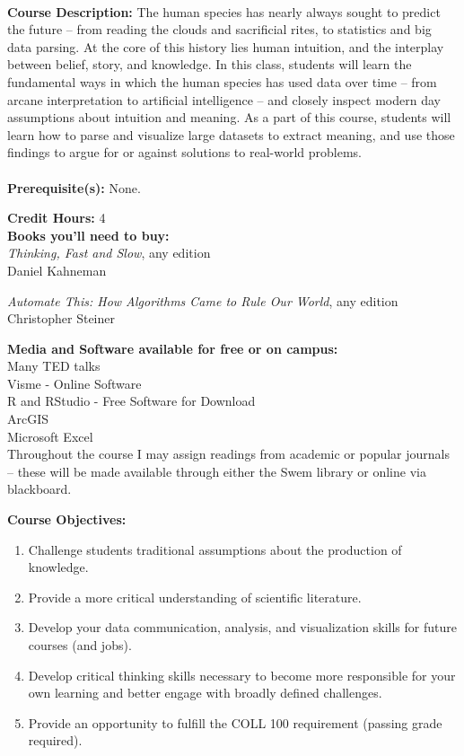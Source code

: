\documentclass[11pt]{article}
\begin{document}
\textbf {\large \\ Course Description:} The human species has nearly always sought to predict the future – from reading the clouds and sacrificial rites, to statistics and big data parsing. At the core of this history lies human intuition, and the interplay between belief, story, and knowledge. In this class, students will learn the fundamental ways in which the human species has used data over time – from arcane interpretation to artificial intelligence – and closely inspect modern day assumptions about intuition and meaning. As a part of this course, students will learn how to parse and visualize large datasets to extract meaning, and use those findings to argue for or against solutions to real-world problems. \\
\\
\textbf {Prerequisite(s):} None.

\textbf {Credit Hours:} 4 \\

\textbf {\large Books you'll need to buy:}\\ \emph{Thinking, Fast and Slow}, any edition \\
Daniel Kahneman 
\vspace{2mm}

\emph{Automate This: How Algorithms Came to Rule Our World}, any edition \\
Christopher Steiner
\vspace{2mm}

\textbf {\large Media and Software available for free or on campus:}\\

Many TED talks\\
Visme - Online Software\\
R and RStudio - Free Software for Download\\
ArcGIS\\
Microsoft Excel\\

Throughout the course I may assign readings from academic or popular journals – these will be made available through either the Swem library or online via blackboard.

\vspace{8mm}

\textbf {\large Course Objectives:} 
\begin{enumerate} \itemsep-0.4em
  \item Challenge students traditional assumptions about the production of knowledge.
  \item Provide a more critical understanding of scientific literature.
  \item Develop your data communication, analysis, and visualization skills for future courses (and jobs).
  \item Develop critical thinking skills necessary to become more responsible for your own learning and better engage with broadly defined challenges.
  \item Provide an opportunity to fulfill the COLL 100 requirement (passing grade required).
\end{enumerate}
\vspace{8mm}
\end{document}
